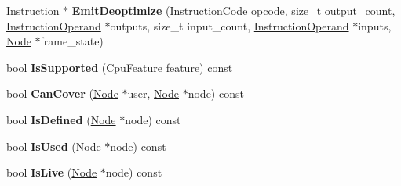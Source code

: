\begin{DoxyCompactItemize}
\item 
\hyperlink{classv8_1_1internal_1_1compiler_1_1_instruction}{Instruction} $\ast$ {\bfseries Emit\+Deoptimize} (Instruction\+Code opcode, size\+\_\+t output\+\_\+count, \hyperlink{classv8_1_1internal_1_1compiler_1_1_instruction_operand}{Instruction\+Operand} $\ast$outputs, size\+\_\+t input\+\_\+count, \hyperlink{classv8_1_1internal_1_1compiler_1_1_instruction_operand}{Instruction\+Operand} $\ast$inputs, \hyperlink{classv8_1_1internal_1_1compiler_1_1_node}{Node} $\ast$frame\+\_\+state)\hypertarget{classv8_1_1internal_1_1compiler_1_1_instruction_selector_a143c4dee63cbdf3e4a8a81b78c33f8f8}{}\label{classv8_1_1internal_1_1compiler_1_1_instruction_selector_a143c4dee63cbdf3e4a8a81b78c33f8f8}

\item 
bool {\bfseries Is\+Supported} (Cpu\+Feature feature) const \hypertarget{classv8_1_1internal_1_1compiler_1_1_instruction_selector_a2da22a0fdb86762d33bd02ffe80ec39a}{}\label{classv8_1_1internal_1_1compiler_1_1_instruction_selector_a2da22a0fdb86762d33bd02ffe80ec39a}

\item 
bool {\bfseries Can\+Cover} (\hyperlink{classv8_1_1internal_1_1compiler_1_1_node}{Node} $\ast$user, \hyperlink{classv8_1_1internal_1_1compiler_1_1_node}{Node} $\ast$node) const \hypertarget{classv8_1_1internal_1_1compiler_1_1_instruction_selector_a1463cb1df9e8b023b0449c710d92991d}{}\label{classv8_1_1internal_1_1compiler_1_1_instruction_selector_a1463cb1df9e8b023b0449c710d92991d}

\item 
bool {\bfseries Is\+Defined} (\hyperlink{classv8_1_1internal_1_1compiler_1_1_node}{Node} $\ast$node) const \hypertarget{classv8_1_1internal_1_1compiler_1_1_instruction_selector_a22558bd2c0cbc16405705a208d24721d}{}\label{classv8_1_1internal_1_1compiler_1_1_instruction_selector_a22558bd2c0cbc16405705a208d24721d}

\item 
bool {\bfseries Is\+Used} (\hyperlink{classv8_1_1internal_1_1compiler_1_1_node}{Node} $\ast$node) const \hypertarget{classv8_1_1internal_1_1compiler_1_1_instruction_selector_a581ea24650893c847cf7baa2689dc9e2}{}\label{classv8_1_1internal_1_1compiler_1_1_instruction_selector_a581ea24650893c847cf7baa2689dc9e2}

\item 
bool {\bfseries Is\+Live} (\hyperlink{classv8_1_1internal_1_1compiler_1_1_node}{Node} $\ast$node) const \hypertarget{classv8_1_1internal_1_1compiler_1_1_instruction_selector_a7dc53579d878d6b130f78f9cd4efecab}{}\label{classv8_1_1internal_1_1compiler_1_1_instruction_selector_a7dc53579d878d6b130f78f9cd4efecab}


\end{DoxyCompactItemize}
